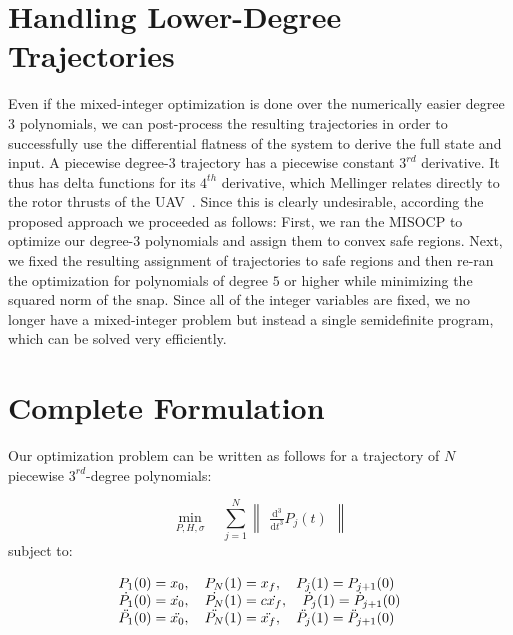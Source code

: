 


\section{Handling Lower-Degree Trajectories}
Even if the mixed-integer optimization is done over the numerically easier degree $3$ polynomials, we can post-process the resulting trajectories in order to successfully use the differential flatness of the system to derive the full state and input. A piecewise degree-$3$ trajectory has a piecewise constant $3^{rd}$ derivative. It thus has delta functions for its $4^{th}$ derivative, which Mellinger relates directly to the rotor thrusts of the
UAV~\cite{mellinger2011minimum}. Since this is clearly undesirable, according the proposed approach we proceeded as follows: First, we ran the MISOCP to optimize our degree-$3$ polynomials and assign them to convex safe regions. Next, we fixed the resulting assignment of trajectories to safe regions and then re-ran the optimization for polynomials of degree
$5$ or higher while minimizing the squared norm of the snap. Since all of the integer variables are fixed, we no longer have a mixed-integer problem but instead a single semidefinite program, which can be solved very efficiently. 

\section{Complete Formulation}

Our optimization problem can be written as follows for a
trajectory of $N$ piecewise $3^{rd}$-degree polynomials:

	
\begin{equation}  \label{eq:eq20_deits}
\min_{P,H,\sigma} \quad  \sum_{j=1}^{N} \begin{Vmatrix}\frac{\mathrm{d}^3 }{\mathrm{d} t^3}
P_{j}(t) 
\end{Vmatrix}
\end{equation}subject to:


\[
\begin{array}{@{}l@{}} 
P_{1}(0) = {x_{0}}, \quad {P_{N}}(1) = {x_{f}}, \quad  {P_{j}}(1) = {P_{j+1}}(0) \\

{\dot{P_1}}(0) = {\dot{x_0}}, \quad {\dot{P_N}}(1) = c{\dot{x_f}}, \quad {\dot{P_j}}(1) = {\dot{P}_{j+1}}(0) \\

{\ddot{P_1}}(0) = {\ddot{x_0}}, \quad {\ddot{P_N}}(1) = {\ddot{x_f}}, \quad {\ddot{P_j}}(1) = {\ddot{P}_{j+1}}(0)

\end{array}
\]


